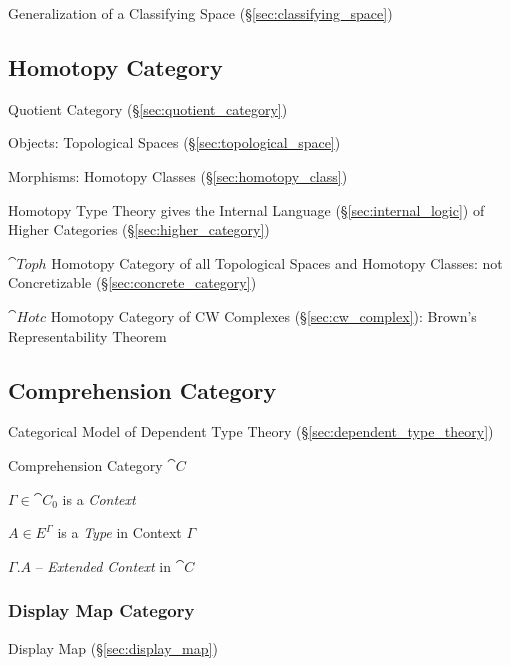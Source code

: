 Generalization of a Classifying Space (\S\ref{sec:classifying_space})



\subsection{Homotopy Category}\label{sec:homotopy_category}

Quotient Category (\S\ref{sec:quotient_category})

Objects: Topological Spaces (\S\ref{sec:topological_space})

Morphisms: Homotopy Classes (\S\ref{sec:homotopy_class})

Homotopy Type Theory gives the Internal Language
(\S\ref{sec:internal_logic}) of Higher Categories
(\S\ref{sec:higher_category})

$\cat{Toph}$ Homotopy Category of all Topological Spaces and Homotopy
Classes: not Concretizable (\S\ref{sec:concrete_category})

$\cat{Hotc}$ Homotopy Category of CW Complexes
(\S\ref{sec:cw_complex}): Brown's Representability Theorem



\subsection{Comprehension Category}\label{sec:comprehension_category}

Categorical Model of Dependent Type Theory
(\S\ref{sec:dependent_type_theory})

Comprehension Category $\cat{C}$

$\Gamma \in \cat{C}_0$ is a \emph{Context}

$A \in E^\Gamma$ is a \emph{Type} in Context $\Gamma$

$\Gamma.A$ -- \emph{Extended Context} in $\cat{C}$



\subsubsection{Display Map Category}\label{sec:display_map_category}

Display Map (\S\ref{sec:display_map})



